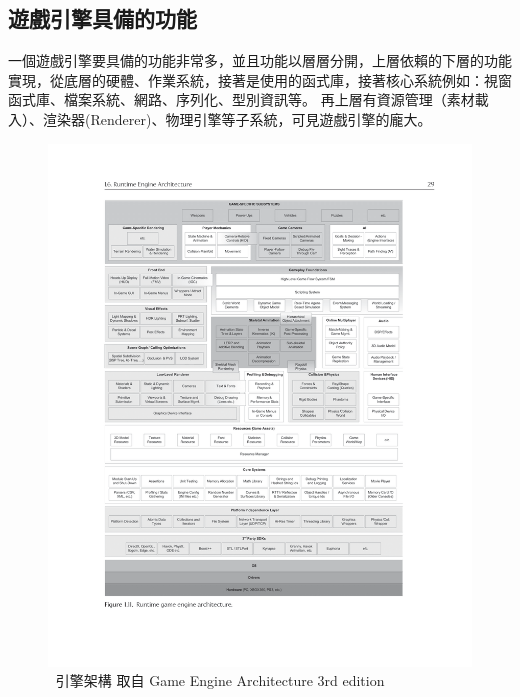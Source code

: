\subsection{遊戲引擎具備的功能}

一個遊戲引擎要具備的功能非常多，並且功能以層層分開，上層依賴的下層的功能實現，從底層的硬體、作業系統，接著是使用的函式庫，接著核心系統例如：視窗函式庫、檔案系統、網路、序列化、型別資訊等。
再上層有資源管理（素材載入）、渲染器(Renderer)、物理引擎等子系統，可見遊戲引擎的龐大。 \cite{Gregory.2018}

\begin{figure}[h]
    \begin{center}
    \includegraphics[width=\textwidth]{./resources/engine_arch.png}
    \end{center}
\caption*{引擎架構 取自 Game Engine Architecture 3rd edition}
\label{fig:EngineArch}
\end{figure}

\newpage